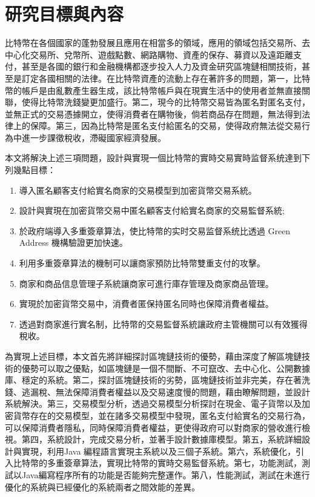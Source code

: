 		

	\section{研究目標與內容}
	比特幣在各個國家的蓬勃發展且應用在相當多的領域，應用的領域包括交易所、去中心化交易所、兌幣所、遊戲點數、網路購物、資產的保存、募資以及遠距離支付，甚至是各國的銀行和金融機構都逐步投入人力及資金研究區塊鏈相關技術，甚至是訂定各國相關的法律。在比特幣資產的流動上存在著許多的問題，第一，比特幣的帳戶是由亂數產生器生成，該比特幣帳戶與在現實生活中的使用者並無直接關聯，使得比特幣洗錢變更加盛行。第二，現今的比特幣交易皆為匿名對匿名支付，並無正式的交易憑據開立，使得消費者在購物後，倘若商品存在問題，無法得到法律上的保障。第三，因為比特幣是匿名支付給匿名的交易，使得政府無法從交易行為中進一步課徵稅收，滯礙國家經濟發展。

	本文將解決上述三項問題，設計與實現一個比特幣的實時交易實時监督系统達到下列幾點目標：

		\begin{enumerate}
			\item 導入匿名顧客支付給實名商家的交易模型到加密貨幣交易系統。
			\item 設計與實現在加密貨幣交易中匿名顧客支付給實名商家的交易監督系統;
			\item 於政府端導入多重簽章算法，使比特幣的实时交易监督系统比透過 Green Address 機構驗證更加快速。
			\item 利用多重簽章算法的機制可以讓商家預防比特幣雙重支付的攻擊。
			\item 商家和商品信息管理⼦系統讓商家可進行庫存管理及商家商品管理。
			\item 實現於加密貨幣交易中，消費者匿保持匿名同時也保障消費者權益。
			\item 透過對商家進行實名制，比特幣的交易監督系統讓政府主管機關可以有效獲得稅收。
		\end{enumerate}

	為實現上述目標，本文首先將詳細探討區塊鏈技術的優勢，藉由深度了解區塊鏈技術的優勢可以取之優點，如區塊鏈是一個不間斷、不可竄改、去中心化、公開數據庫、穩定的系統。第二，探討區塊鏈技術的劣勢，區塊鏈技術並非完美，存在著洗錢、逃漏稅、無法保障消費者權益以及交易速度慢的問題，藉由瞭解問題，並設計系統解決。第三，交易模型分析，透過交易模型分析探討在現金、電子貨幣以及加密貨幣存在的交易模型，並在諸多交易模型中發現，匿名支付給實名的交易行為，可以保障消費者隱私，同時保障消費者權益，更使得政府可以對商家的營收進行檢視。第四，系統設計，完成交易分析，並著⼿設計數據庫模型。第五，系統詳細設計與實現，利⽤Java 編程語⾔實現主系統以及三個⼦系統。第六，系統優化，引入比特幣的多重簽章算法，實現比特幣的實時交易監督系統。第七，功能測試，測試以Java編寫程序所有的功能是否能夠完整運作。第八，性能測試，測試在未進行優化的系統與已經優化的系統兩者之間效能的差異。


